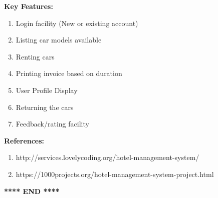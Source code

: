 \documentclass[12pt]{article}
\begin{document}
\noindent
\textbf{Key Features:}
\begin{enumerate}
    \item Login facility (New or existing account)
    \item Listing car models available
    \item Renting cars
    \item Printing invoice based on duration
    \item User Profile Display
    \item Returning the cars
    \item Feedback/rating facility
\end{enumerate}

\noindent
\textbf{References:}
\begin{enumerate}
    \item http://services.lovelycoding.org/hotel-management-system/
    \item https://1000projects.org/hotel-management-system-project.html
\end{enumerate}


\begin{center}
    \textbf{**** END ****}
\end{center}
\end{document}
